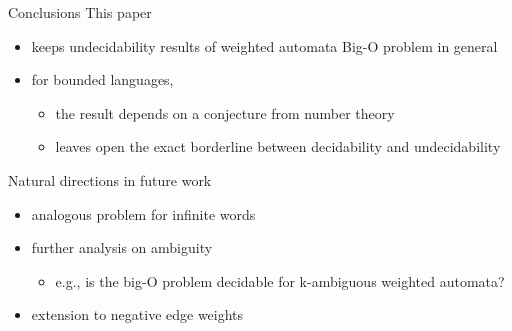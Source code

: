 \documentclass[aspectratio=169]{beamer}
\begin{document}
\begin{frame}{Conclusions}
    This paper
    \begin{itemize}
        \item keeps undecidability results of weighted automata Big-O problem in general
        \item for bounded languages,
        \begin{itemize}
            \item the result depends on a conjecture from number theory
            \item leaves open the exact borderline between decidability and undecidability
        \end{itemize}
    \end{itemize}
    Natural directions in future work
    \begin{itemize}
        \item analogous problem for infinite words
        \item further analysis on ambiguity
        \begin{itemize}
            \item e.g., is the big-O problem decidable for k-ambiguous weighted automata?
        \end{itemize}
        \item extension to negative edge weights 
    \end{itemize}
\end{frame}
\end{document}
